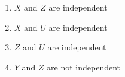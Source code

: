 \begin{enumerate}[label=\thesection.\arabic*.,ref=\thesection.\theenumi]
\begin{enumerate}
    \item $X$ and $Z$ are independent \label{option 1}
    \item $X$ and $U$ are independent \label{option 2}
    \item $Z$ and $U$ are independent \label{option 3}
    \item $Y$ and $Z$ are not independent \label{option 4}
\end{enumerate}
%
\solution



\end{enumerate}
